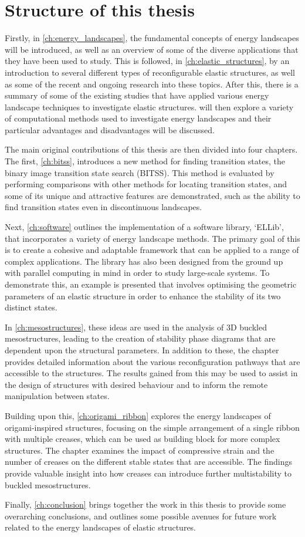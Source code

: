 \section{Structure of this thesis}
Firstly, in \cref{ch:energy_landscapes}, the fundamental concepts of energy landscapes will be introduced, as well as an overview of some of the diverse applications that they have been used to study.
This is followed, in \cref{ch:elastic_structures}, by an introduction to several different types of reconfigurable elastic structures, as well as some of the recent and ongoing research into these topics.
After this, there is a summary of some of the existing studies that have applied various energy landscape techniques to investigate elastic structures.
 will then explore a variety of computational methods used to investigate energy landscapes and their particular advantages and disadvantages will be discussed.

The main original contributions of this thesis are then divided into four chapters. The first, \cref{ch:bitss}, introduces a new method for finding transition states, the binary image transition state search (BITSS).
This method is evaluated by performing comparisons with other methods for locating transition states, and some of its unique and attractive features are demonstrated, such as the ability to find transition states even in discontinuous landscapes.

Next, \cref{ch:software} outlines the implementation of a software library, `ELLib', that incorporates a variety of energy landscape methods.
The primary goal of this is to create a cohesive and adaptable framework that can be applied to a range of complex applications.
The library has also been designed from the ground up with parallel computing in mind in order to study large-scale systems.
To demonstrate this, an example is presented that involves optimising the geometric parameters of an elastic structure in order to enhance the stability of its two distinct states.

In \cref{ch:mesostructures}, these ideas are used in the analysis of 3D buckled mesostructures, leading to the creation of stability phase diagrams that are dependent upon the structural parameters.
In addition to these, the chapter provides detailed information about the various reconfiguration pathways that are accessible to the structures.
The results gained from this may be used to assist in the design of structures with desired behaviour and to inform the remote manipulation between states.

Building upon this, \cref{ch:origami_ribbon} explores the energy landscapes of origami-inspired structures, focusing on the simple arrangement of a single ribbon with multiple creases, which can be used as building block for more complex structures.
The chapter examines the impact of compressive strain and the number of creases on the different stable states that are accessible.
The findings provide valuable insight into how creases can introduce further multistability to buckled mesostructures.

Finally, \cref{ch:conclusion} brings together the work in this thesis to provide some overarching conclusions, and outlines some possible avenues for future work related to the energy landscapes of elastic structures.
